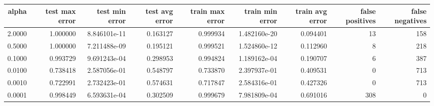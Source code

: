 
\begin{table}[ht]
\tiny
\begin{tabular}{rrrrrrrrr}
\toprule
 alpha &  test max error &  test min error &  test avg error &  train max error &  train min error &  train avg error &  false positives &  false negatives \\
\midrule
2.0000 &        1.000000 &    8.846101e-11 &        0.163127 &         0.999934 &     1.482160e-20 &         0.094401 &               13 &              158 \\
0.5000 &        1.000000 &    7.211488e-09 &        0.195121 &         0.999521 &     1.524860e-12 &         0.112960 &                8 &              218 \\
0.1000 &        0.993729 &    9.691243e-04 &        0.298953 &         0.994824 &     1.189162e-04 &         0.190707 &                6 &              387 \\
0.0100 &        0.738418 &    2.587056e-01 &        0.548797 &         0.733870 &     2.397937e-01 &         0.409531 &                0 &              713 \\
0.0010 &        0.722991 &    2.732423e-01 &        0.574631 &         0.717847 &     2.584316e-01 &         0.427326 &                0 &              713 \\
0.0001 &        0.998449 &    6.593631e-04 &        0.302509 &         0.999679 &     7.981809e-04 &         0.691016 &              308 &                0 \\
\bottomrule
\end{tabular}
\end{table}